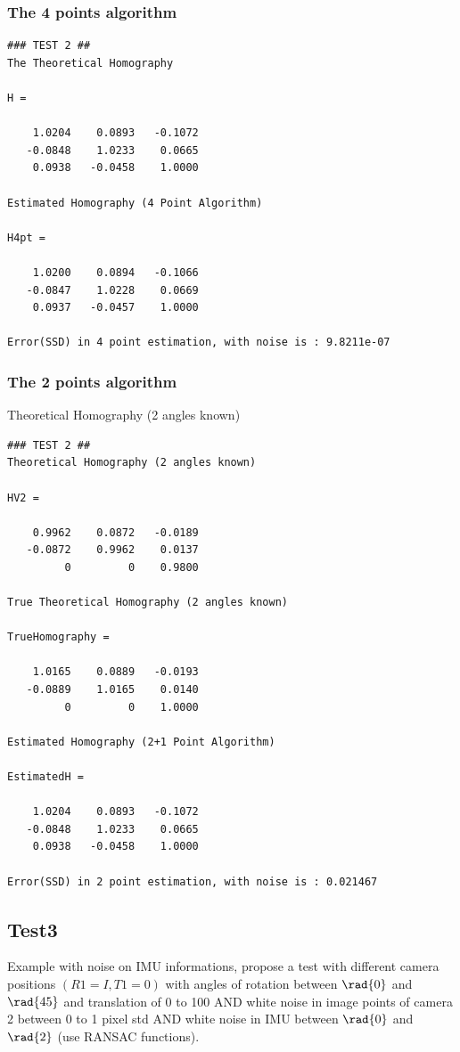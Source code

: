 \documentclass[a4paper,12pt]{article}
\begin{document}
\subsubsection{The 4 points algorithm}
\begin{verbatim}
### TEST 2 ##
The Theoretical Homography

H =

    1.0204    0.0893   -0.1072
   -0.0848    1.0233    0.0665
    0.0938   -0.0458    1.0000

Estimated Homography (4 Point Algorithm)

H4pt =

    1.0200    0.0894   -0.1066
   -0.0847    1.0228    0.0669
    0.0937   -0.0457    1.0000

Error(SSD) in 4 point estimation, with noise is : 9.8211e-07
\end{verbatim}


\subsubsection{The 2 points algorithm}

Theoretical Homography (2 angles known)

\begin{verbatim}
### TEST 2 ##
Theoretical Homography (2 angles known)

HV2 =

    0.9962    0.0872   -0.0189
   -0.0872    0.9962    0.0137
         0         0    0.9800

True Theoretical Homography (2 angles known)

TrueHomography =

    1.0165    0.0889   -0.0193
   -0.0889    1.0165    0.0140
         0         0    1.0000

Estimated Homography (2+1 Point Algorithm)

EstimatedH =

    1.0204    0.0893   -0.1072
   -0.0848    1.0233    0.0665
    0.0938   -0.0458    1.0000

Error(SSD) in 2 point estimation, with noise is : 0.021467
\end{verbatim}

\subsection{Test3}
Example with noise on IMU informations, propose a test with different camera positions $(R1 =
I, T1 = 0)$ with angles of rotation between $\rad{0}$ and $\rad{45}$ and translation of 0 to
100 AND white noise in image points of camera 2 between 0 to 1 pixel std AND white noise in IMU between $\rad{0}$ and $\rad{2}$ (use
RANSAC functions).
\end{document}
